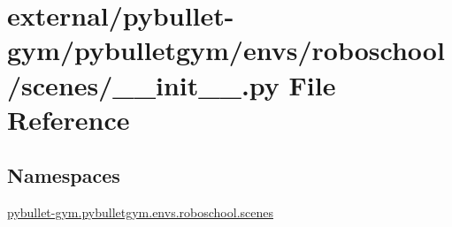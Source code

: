 \hypertarget{external_2pybullet-gym_2pybulletgym_2envs_2roboschool_2scenes_2____init_____8py}{}\section{external/pybullet-\/gym/pybulletgym/envs/roboschool/scenes/\+\_\+\+\_\+init\+\_\+\+\_\+.py File Reference}
\label{external_2pybullet-gym_2pybulletgym_2envs_2roboschool_2scenes_2____init_____8py}
\subsection*{Namespaces}
\begin{DoxyCompactItemize}
\item 
 \hyperlink{namespacepybullet-gym_1_1pybulletgym_1_1envs_1_1roboschool_1_1scenes}{pybullet-\/gym.\+pybulletgym.\+envs.\+roboschool.\+scenes}
\end{DoxyCompactItemize}
